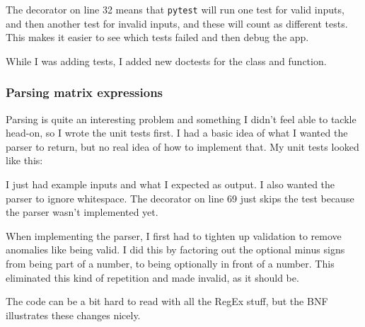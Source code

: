 \documentclass[../development.tex]{subfiles}
\begin{document}
The  decorator on line 32 means that \texttt{pytest} will run one test for valid inputs, and then another test for invalid inputs, and these will count as different tests. This makes it easier to see which tests failed and then debug the app.

While I was adding tests, I added new doctests for the  class and  function.




\subsubsection{Parsing matrix expressions\label{development:matrices-backend:parsing-matrix-expressions}}

Parsing is quite an interesting problem and something I didn't feel able to tackle head-on, so I wrote the unit tests first. I had a basic idea of what I wanted the parser to return, but no real idea of how to implement that. My unit tests looked like this:



I just had example inputs and what I expected as output. I also wanted the parser to ignore whitespace. The decorator on line 69 just skips the test because the parser wasn't implemented yet.

When implementing the parser, I first had to tighten up validation to remove anomalies like  being valid. I did this by factoring out the optional minus signs from being part of a number, to being optionally in front of a number. This eliminated this kind of repetition and made  invalid, as it should be.


The code can be a bit hard to read with all the RegEx stuff, but the BNF illustrates these changes nicely.
\end{document}
